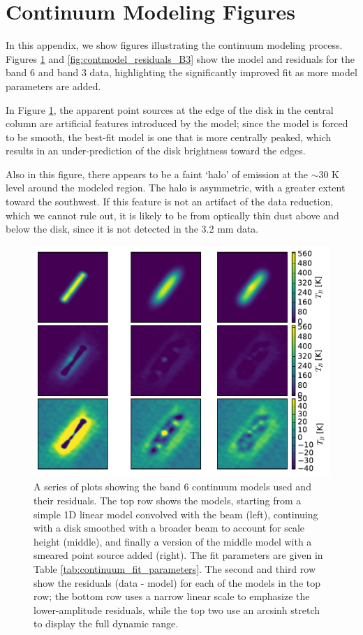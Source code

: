 \documentclass[twocolumn]{aastex61}
\begin{document}
\section{Continuum Modeling Figures}
\label{appendix:contmodel}
In this appendix, we show figures illustrating the continuum modeling process.
Figures \ref{fig:contmodel_residuals_B6} and \ref{fig:contmodel_residuals_B3}
show the model and residuals for the band 6 and band 3 data, highlighting the
significantly improved fit as more model parameters are added.

In Figure \ref{fig:contmodel_residuals_B6}, the apparent point sources at the
edge of the disk in the central column are artificial features introduced by
the model; since the model is forced to be smooth, the best-fit model is one
that is more centrally peaked, which results in an under-prediction of the disk
brightness toward the edges.  

Also in this figure, there appears to be a faint `halo' of emission at the
$\sim30$ K level around the modeled region.  The halo is asymmetric, with a
greater extent toward the southwest.  If this feature is not an artifact of the
data reduction, which we cannot rule out, it is likely to be from optically
thin dust above and below the disk, since it is not detected in the 3.2 mm data.



\begin{figure}[!htp]
\includegraphics[scale=1,width=7.5in]{figures/models_and_residuals_B6.pdf}
\caption{A series of plots showing the band 6 continuum models used and their residuals.
The top row shows the models, starting from a simple 1D linear model convolved
with the beam (left), continuing with a disk smoothed with a broader beam to
account for scale height (middle), and finally a version of the middle model
with a smeared point source added (right).  The fit parameters are given in Table
\ref{tab:continuum_fit_parameters}.  The second and third row show the
residuals (data - model) for each of the models in the top row; the bottom row
uses a narrow linear scale to emphasize the lower-amplitude residuals, while
the top two use an arcsinh stretch to display the full dynamic range.
}
\label{fig:contmodel_residuals_B6}
\end{figure}
\end{document}
